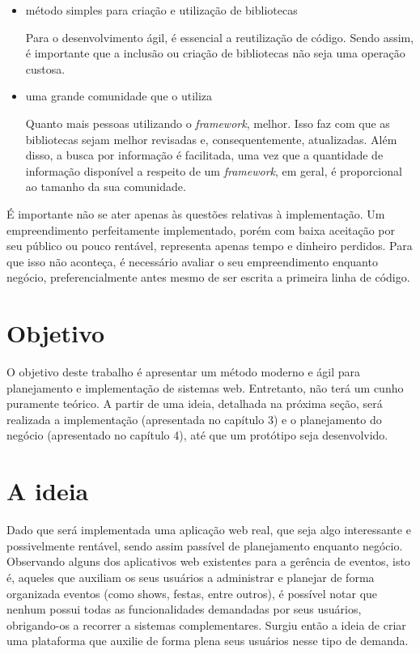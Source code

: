 \begin{itemize}
\item método simples para criação e utilização de bibliotecas

Para o desenvolvimento ágil, é essencial a reutilização de código. Sendo assim, é importante que a inclusão ou criação de bibliotecas não seja uma operação custosa.

\item uma grande comunidade que o utiliza

Quanto mais pessoas utilizando o \textit{framework}, melhor. Isso faz com que as bibliotecas sejam melhor revisadas e, consequentemente, atualizadas. Além disso, a busca por informação é facilitada, uma vez que a quantidade de informação disponível a respeito de um \textit{framework}, em geral, é proporcional ao tamanho da sua comunidade.

\end{itemize}

É importante não se ater apenas às questões relativas à implementação. Um empreendimento perfeitamente implementado, porém com baixa aceitação por seu público ou pouco rentável, representa apenas tempo e dinheiro perdidos. Para que isso não aconteça, é necessário avaliar o seu empreendimento enquanto negócio, preferencialmente antes mesmo de ser escrita a primeira linha de código.

\section{Objetivo}

O objetivo deste trabalho é apresentar um método moderno e ágil para planejamento e implementação de sistemas web. Entretanto, não terá um cunho puramente teórico. A partir de uma ideia, detalhada na próxima seção, será realizada a implementação (apresentada no capítulo 3) e o planejamento do negócio (apresentado no capítulo 4), até que um protótipo seja desenvolvido.

\section{A ideia}

Dado que será implementada uma aplicação web real, que seja algo interessante e possivelmente rentável, sendo assim passível de planejamento enquanto negócio. Observando alguns dos aplicativos web existentes para a gerência de eventos, isto é, aqueles que auxiliam os seus usuários a administrar e planejar de forma organizada eventos (como shows, festas, entre outros), é possível notar que nenhum possui todas as funcionalidades demandadas por seus usuários, obrigando-os a recorrer a sistemas complementares. Surgiu então a ideia de criar uma plataforma que auxilie de forma plena seus usuários nesse tipo de demanda.

